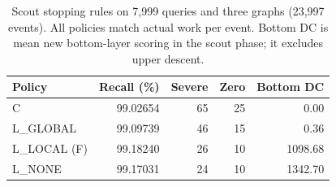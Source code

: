 \begin{table}[t]
\centering
\caption{Scout stopping rules on 7,999 queries and three graphs (23,997 events). All policies match actual work per event. Bottom DC is mean new bottom-layer scoring in the scout phase; it excludes upper descent.}
\label{tab:stop}
\small
\begin{tabular}{@{}lrrrr@{}}
\toprule
Policy & Recall (\%) & Severe & Zero & Bottom DC \\
\midrule
C & 99.02654 & 65 & 25 & 0.00 \\
L\_GLOBAL & 99.09739 & 46 & 15 & 0.36 \\
L\_LOCAL (F) & 99.18240 & 26 & 10 & 1098.68 \\
L\_NONE & 99.17031 & 24 & 10 & 1342.70 \\
\bottomrule
\end{tabular}
\end{table}
